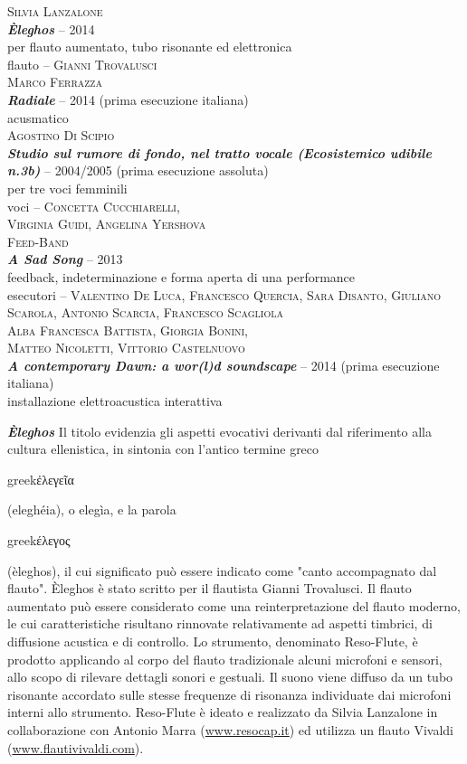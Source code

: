 \documentclass[9pt, twoside, a5paper]{extreport}
\newcommand{\greco}[1]{%
\begin{otherlanguage*}{greek}#1\end{otherlanguage*}}
\newcommand{\brano}[6]{%
\noindent \textsc{#1}\\ %
\noindent \textbf{\textit{#2}} -- #3\\%
\noindent #4\\ %
\noindent #5 -- \textsc{#6}%
\\
}%
\newcommand{\installazione}[4]{%
\noindent \textsc{#1}\\ %
\noindent \textbf{\textit{#2}} -- #3\\%
\noindent #4%
\\
}%
\newcommand{\descrizione}[2]{%
\noindent \textbf{\textit{#1}} %
#2 %
\\
}%
\begin{document}
\begin{multicols}{2}


\brano{Silvia Lanzalone}
{Èleghos}{2014}
{per flauto aumentato, tubo risonante ed elettronica}
{flauto}{Gianni Trovalusci}


\installazione{Marco Ferrazza}
{Radiale}{2014 (prima esecuzione italiana)}
{acusmatico}


\brano{Agostino Di Scipio}
{Studio sul rumore di fondo, nel tratto vocale (Ecosistemico udibile n.3b)}{2004/2005 (prima esecuzione assoluta)}
{per tre voci femminili}
{voci}{Concetta Cucchiarelli, \\Virginia Guidi, Angelina Yershova}


\brano{Feed-Band} %
{A Sad Song}{2013}
{feedback, indeterminazione e forma aperta di una performance}
{esecutori}{Valentino De Luca, Francesco Quercia, Sara Disanto, Giuliano Scarola, Antonio Scarcia, Francesco Scagliola}

\vspace{1cm}
\installazione{Alba Francesca Battista, Giorgia Bonini,\\Matteo Nicoletti, Vittorio Castelnuovo}
{A contemporary Dawn: a wor(l)d soundscape}{2014 (prima esecuzione italiana)}
{installazione elettroacustica interattiva}

\bigskip



\descrizione{Èleghos}{Il titolo evidenzia gli aspetti evocativi derivanti dal riferimento alla cultura ellenistica, in sintonia con l’antico termine greco \greco{ἐλεγεῖα} (eleghéia), o elegìa, e la parola \greco{έλεγος} (èleghos), il cui significato può essere indicato come "canto accompagnato dal flauto". Èleghos è stato scritto per il flautista Gianni Trovalusci.
Il flauto aumentato può essere considerato come una reinterpretazione del flauto moderno, le cui caratteristiche risultano rinnovate relativamente ad aspetti timbrici, di diffusione acustica e di controllo. Lo strumento, denominato Reso-Flute, è prodotto applicando al corpo del flauto tradizionale alcuni microfoni e sensori, allo scopo di rilevare dettagli sonori e gestuali. Il suono viene diffuso da un tubo risonante accordato sulle stesse frequenze di risonanza individuate dai microfoni interni allo strumento.
Reso-Flute è ideato e realizzato da Silvia Lanzalone in collaborazione con Antonio Marra (\href{http://www.resocap.it/}{www.resocap.it}) ed utilizza un flauto Vivaldi (\href{http://www.flautivivaldi.com/}{www.flautivivaldi.com}).}


\end{multicols}
\end{document}
